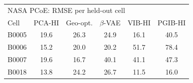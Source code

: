 \begin{tabular}{l c c c c c}
\hline
\multicolumn{6}{l}{NASA PCoE: RMSE per held-out cell}\\
 Cell & PCA-HI & Geo-opt. & $\beta$-VAE & VIB-HI & PGIB-HI \\
\hline
B0005 & 19.6 & 26.3 & 24.9 & 16.1 & 40.5 \\
B0006 & 15.2 & 20.0 & 20.2 & 51.7 & 78.4 \\
B0007 & 19.6 & 16.7 & 40.1 & 41.1 & 47.3 \\
B0018 & 13.8 & 24.2 & 26.7 & 11.5 & 16.0 \\
\hline
\end{tabular}
